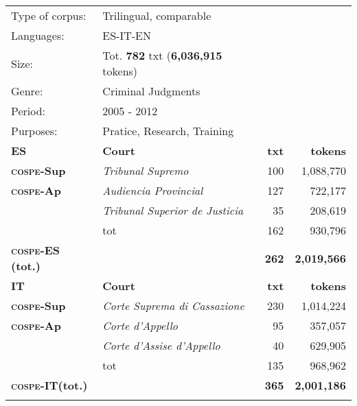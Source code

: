 \documentclass[output=paper]{LSP/langsci}
\begin{document}
\begin{table}
     \centering
     \begin{tabular}{llrr}
     \lsptoprule
Type of corpus: & Trilingual, comparable && \\
Languages: & ES-IT-EN && \\
Size: & Tot. \textbf{782} txt (\textbf{6,036,915} tokens) && \\
Genre: & Criminal Judgments && \\
Period: & 2005 - 2012 && \\
Purposes: & Pratice, Research, Training   && \\
     \lsptoprule
       \textbf{ES}  & \textbf{Court}       & \textbf{txt}  &  \textbf{tokens} \\ \midrule
       \textbf{\textsc{cospe}-\textsc{S}up}    & \textit{Tribunal Supremo}          & 100				& 1,088,770\\
       \textbf{\textsc{cospe}-\textsc{A}p}       & \textit{Audiencia Provincial}    & 127				& 722,177\\
                     & \textit{Tribunal Superior de Justicia}      & 35				& 208,619\\
                      & tot             & 162				& 930,796\\ \midrule
       \textbf{\textsc{cospe}-ES (tot.)}    &              & \textbf{262}				& \textbf{2,019,566}\\ 

\lspbottomrule
       \textbf{IT}  & \textbf{Court}       & \textbf{txt}  & \textbf{tokens} \\ \midrule
       \textbf{\textsc{cospe}-\textsc{S}up}    & \textit{Corte Suprema di Cassazione}             & 230				& 1,014,224\\
       \textbf{\textsc{cospe}-\textsc{A}p}       & \textit{Corte d’Appello}             & 95				& 357,057\\
                     & \textit{Corte d’Assise d’Appello}             & 40				& 629,905\\
                      & tot             & 135				& 968,962\\ \hline
       \textbf{\textsc{cospe}-IT(tot.)}   &    &     \textbf{365}				& \textbf{2,001,186}\\  
\lspbottomrule


\end{tabular}
\end{table}
\end{document}
